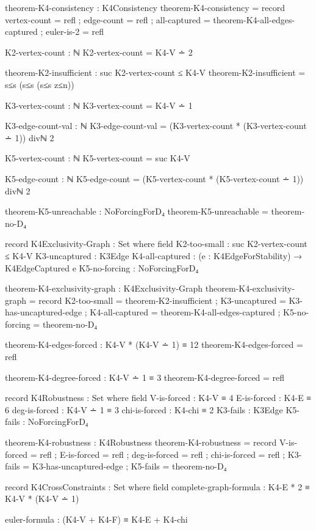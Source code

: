 \documentclass[11pt,a4paper]{book}
\begin{document}
\begin{code}
theorem-K4-consistency : K4Consistency
theorem-K4-consistency = record
  { vertex-count = refl
  ; edge-count   = refl
  ; all-captured = theorem-K4-all-edges-captured
  ; euler-is-2   = refl
  }

K2-vertex-count : ℕ
K2-vertex-count = K4-V ∸ 2


theorem-K2-insufficient : suc K2-vertex-count ≤ K4-V
theorem-K2-insufficient = s≤s (s≤s (s≤s z≤n))

K3-vertex-count : ℕ
K3-vertex-count = K4-V ∸ 1

K3-edge-count-val : ℕ
K3-edge-count-val = (K3-vertex-count * (K3-vertex-count ∸ 1)) divℕ 2

K5-vertex-count : ℕ
K5-vertex-count = suc K4-V

K5-edge-count : ℕ
K5-edge-count = (K5-vertex-count * (K5-vertex-count ∸ 1)) divℕ 2

theorem-K5-unreachable : NoForcingForD₄
theorem-K5-unreachable = theorem-no-D₄

record K4Exclusivity-Graph : Set where
  field
    K2-too-small    : suc K2-vertex-count ≤ K4-V
    K3-uncaptured   : K3Edge
    K4-all-captured : (e : K4EdgeForStability) → K4EdgeCaptured e
    K5-no-forcing   : NoForcingForD₄

theorem-K4-exclusivity-graph : K4Exclusivity-Graph
theorem-K4-exclusivity-graph = record
  { K2-too-small    = theorem-K2-insufficient
  ; K3-uncaptured   = K3-has-uncaptured-edge
  ; K4-all-captured = theorem-K4-all-edges-captured
  ; K5-no-forcing   = theorem-no-D₄
  }

theorem-K4-edges-forced : K4-V * (K4-V ∸ 1) ≡ 12
theorem-K4-edges-forced = refl

theorem-K4-degree-forced : K4-V ∸ 1 ≡ 3
theorem-K4-degree-forced = refl

record K4Robustness : Set where
  field
    V-is-forced       : K4-V ≡ 4
    E-is-forced       : K4-E ≡ 6
    deg-is-forced     : K4-V ∸ 1 ≡ 3
    chi-is-forced     : K4-chi ≡ 2
    K3-fails          : K3Edge
    K5-fails          : NoForcingForD₄

theorem-K4-robustness : K4Robustness
theorem-K4-robustness = record
  { V-is-forced   = refl
  ; E-is-forced   = refl
  ; deg-is-forced = refl
  ; chi-is-forced = refl
  ; K3-fails      = K3-has-uncaptured-edge
  ; K5-fails      = theorem-no-D₄
  }

record K4CrossConstraints : Set where
  field
    complete-graph-formula : K4-E * 2 ≡ K4-V * (K4-V ∸ 1)
    
    euler-formula          : (K4-V + K4-F) ≡ K4-E + K4-chi
    

\end{code}
\end{document}
